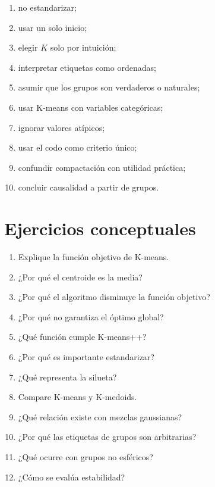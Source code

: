 \documentclass[
  spanish,
  10.5pt,
  letterpaper,
  DIV=11,
  numbers=noendperiod,
  oneside,
  open=any]{scrreprt}
\providecommand{\tightlist}{%
  \setlength{\itemsep}{0pt}\setlength{\parskip}{0pt}}
\theoremstyle{definition}
\theoremstyle{definition}
\theoremstyle{plain}
\theoremstyle{remark}
\begin{document}
\begin{enumerate}
\def\labelenumi{\arabic{enumi}.}
\tightlist
\item
  no estandarizar;
\item
  usar un solo inicio;
\item
  elegir \(K\) solo por intuición;
\item
  interpretar etiquetas como ordenadas;
\item
  asumir que los grupos son verdaderos o naturales;
\item
  usar K-means con variables categóricas;
\item
  ignorar valores atípicos;
\item
  usar el codo como criterio único;
\item
  confundir compactación con utilidad práctica;
\item
  concluir causalidad a partir de grupos.
\end{enumerate}

\section*{Ejercicios conceptuales}\label{ejercicios-conceptuales-16}


\begin{enumerate}
\def\labelenumi{\arabic{enumi}.}
\tightlist
\item
  Explique la función objetivo de K-means.
\item
  ¿Por qué el centroide es la media?
\item
  ¿Por qué el algoritmo disminuye la función objetivo?
\item
  ¿Por qué no garantiza el óptimo global?
\item
  ¿Qué función cumple K-means++?
\item
  ¿Por qué es importante estandarizar?
\item
  ¿Qué representa la silueta?
\item
  Compare K-means y K-medoids.
\item
  ¿Qué relación existe con mezclas gaussianas?
\item
  ¿Por qué las etiquetas de grupos son arbitrarias?
\item
  ¿Qué ocurre con grupos no esféricos?
\item
  ¿Cómo se evalúa estabilidad?
\end{enumerate}
\end{document}
